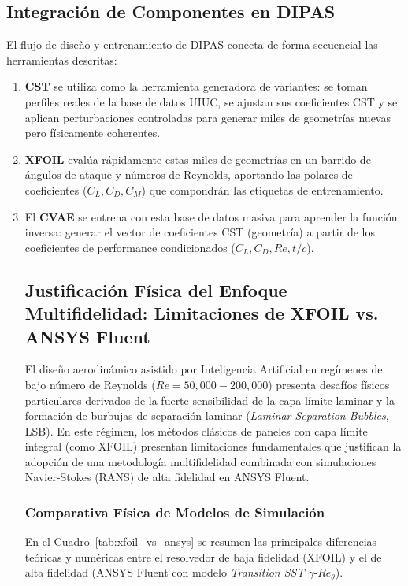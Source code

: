 \subsection{Integración de Componentes en DIPAS}
El flujo de diseño y entrenamiento de DIPAS conecta de forma secuencial las herramientas descritas:
\begin{enumerate}
    \item \textbf{CST} se utiliza como la herramienta generadora de variantes: se toman perfiles reales de la base de datos UIUC, se ajustan sus coeficientes CST y se aplican perturbaciones controladas para generar miles de geometrías nuevas pero físicamente coherentes.
    \item \textbf{XFOIL} evalúa rápidamente estas miles de geometrías en un barrido de ángulos de ataque y números de Reynolds, aportando las polares de coeficientes ($C_L, C_D, C_M$) que compondrán las etiquetas de entrenamiento.
    \item El \textbf{CVAE} se entrena con esta base de datos masiva para aprender la función inversa: generar el vector de coeficientes CST (geometría) a partir de los coeficientes de performance condicionados ($C_L, C_D, Re, t/c$).
\subsection{Justificación Física del Enfoque Multifidelidad: Limitaciones de XFOIL vs. ANSYS Fluent}
\label{subsec:justificacion_multifidelidad}

El diseño aerodinámico asistido por Inteligencia Artificial en regímenes de bajo número de Reynolds ($Re = 50{,}000 - 200{,}000$) presenta desafíos físicos particulares derivados de la fuerte sensibilidad de la capa límite laminar y la formación de burbujas de separación laminar (\textit{Laminar Separation Bubbles}, LSB). En este régimen, los métodos clásicos de paneles con capa límite integral (como XFOIL) presentan limitaciones fundamentales que justifican la adopción de una metodología multifidelidad combinada con simulaciones Navier-Stokes (RANS) de alta fidelidad en ANSYS Fluent.

\subsubsection{Comparativa Física de Modelos de Simulación}
En el Cuadro~\ref{tab:xfoil_vs_ansys} se resumen las principales diferencias teóricas y numéricas entre el resolvedor de baja fidelidad (XFOIL) y el de alta fidelidad (ANSYS Fluent con modelo \textit{Transition SST} $\gamma\text{-}Re_\theta$).


\end{enumerate}
